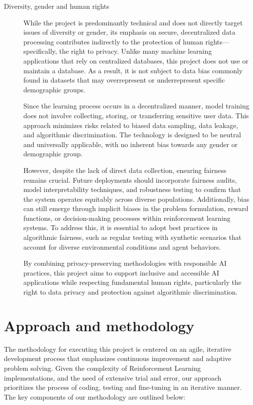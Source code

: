 \documentclass[12pt,a4paper,twoside,openany]{book}
\begin{document}
\begin{description}
    \item[Diversity, gender and human rights] While the project is predominantly technical and does not directly target issues of diversity or gender, its emphasis on secure, decentralized data processing contributes indirectly to the protection of human rights—specifically, the right to privacy. Unlike many machine learning applications that rely on centralized databases, this project does not use or maintain a database. As a result, it is not subject to data bias commonly found in datasets that may overrepresent or underrepresent specific demographic groups.

Since the learning process occurs in a decentralized manner, model training does not involve collecting, storing, or transferring sensitive user data. This approach minimizes risks related to biased data sampling, data leakage, and algorithmic discrimination. The technology is designed to be neutral and universally applicable, with no inherent bias towards any gender or demographic group.

However, despite the lack of direct data collection, ensuring fairness remains crucial. Future deployments should incorporate fairness audits, model interpretability techniques, and robustness testing to confirm that the system operates equitably across diverse populations. Additionally, bias can still emerge through implicit biases in the problem formulation, reward functions, or decision-making processes within reinforcement learning systems. To address this, it is essential to adopt best practices in algorithmic fairness, such as regular testing with synthetic scenarios that account for diverse environmental conditions and agent behaviors.

By combining privacy-preserving methodologies with responsible AI practices, this project aims to support inclusive and accessible AI applications while respecting fundamental human rights, particularly the right to data privacy and protection against algorithmic discrimination.
\end{description}

\section{Approach and methodology}

The methodology for executing this project is centered on an agile, iterative development process that emphasizes continuous improvement and adaptive problem solving. Given the complexity of Reinforcement Learning implementations, and the need of extensive trial and error, our approach prioritizes the process of coding, testing and fine-tuning in an iterative manner. The key components of our methodology are outlined below:
\end{document}
